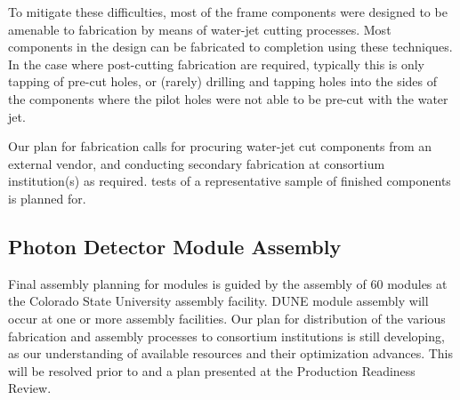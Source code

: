 To mitigate these difficulties, most of the  frame components were designed to be amenable to fabrication by means of water-jet cutting processes.  Most components in the design can be fabricated to completion using these techniques.  In the case where post-cutting fabrication are required, typically this is only tapping of pre-cut holes, or (rarely) drilling and tapping holes into the sides of the components where the pilot holes were not able to be pre-cut with the water jet.

Our plan for fabrication calls for procuring water-jet cut components from an external vendor, and conducting secondary fabrication at consortium institution(s) as required.   tests of a representative sample of finished components is planned for.

\label{sec:fdsp-pd-prod-pc}








\subsection{Photon Detector Module Assembly}

Final assembly planning for  modules is guided by the assembly of \num{60}   modules at the Colorado State University assembly facility. DUNE   module assembly will occur at one or more assembly facilities.  Our plan for distribution of the various fabrication and assembly processes to consortium institutions is still developing, as our understanding of available resources and their optimization advances.  This will be resolved prior to and a plan presented at the Production Readiness Review.

